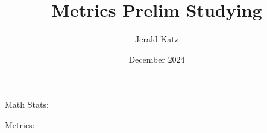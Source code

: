 \documentclass{article}
\title{Metrics Prelim Studying}
\author{Jerald Katz}
\date{December 2024}
\begin{document}
\maketitle

Math Stats:








Metrics:
\end{document}

